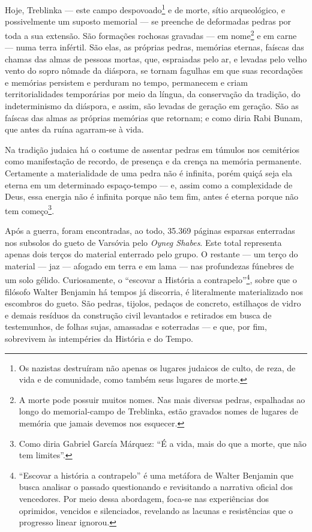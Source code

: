 Hoje, Treblinka --- este campo despovoado\footnote{Os nazistas
  destruíram não apenas os lugares judaicos de culto, de reza, de vida e
  de comunidade, como também seus lugares de morte.} e de morte, sítio
arqueológico, e possivelmente um suposto memorial --- se preenche de
deformadas pedras por toda a sua extensão. São formações rochosas
gravadas --- em nome\footnote{A morte pode possuir muitos nomes. Nas
  mais diversas pedras, espalhadas ao longo do memorial-campo de
  Treblinka, estão gravados nomes de lugares de memória que jamais
  devemos nos esquecer.} e em carne --- numa terra infértil. São elas,
as próprias pedras, memórias eternas, faíscas das chamas das almas de
pessoas mortas, que, espraiadas pelo ar, e levadas pelo velho vento do
sopro nômade da diáspora, se tornam fagulhas em que suas recordações e
memórias persistem e perduram no tempo, permanecem e criam
territorialidades temporárias por meio da língua, da conservação da
tradição, do indeterminismo da diáspora, e assim, são levadas de geração
em geração. São as faíscas das almas as próprias memórias que retornam;
e como diria Rabi Bunam, que antes da ruína agarram-se à vida.

Na tradição judaica há o costume de assentar pedras em túmulos nos
cemitérios como manifestação de recordo, de presença e da crença na
memória permanente. Certamente a materialidade de uma pedra não é
infinita, porém quiçá seja ela eterna em um determinado espaço-tempo ---
e, assim como a complexidade de Deus, essa energia não é infinita porque
não tem fim, antes é eterna porque não tem começo\footnote{Como diria
  Gabriel García Márquez: ``É a vida, mais do que a morte, que não
  tem limites''.}.

Após a guerra, foram encontradas, ao todo, 35.369 páginas esparsas
enterradas nos subsolos do gueto de Varsóvia pelo \emph{Oyneg Shabes}.
Este total representa apenas dois terços do material enterrado pelo
grupo. O restante --- um terço do material --- jaz --- afogado em terra
e em lama --- nas profundezas fúnebres de um solo gélido. Curiosamente,
o ``escovar a História a contrapelo''\footnote{``Escovar a
  história a contrapelo'' é uma metáfora de Walter Benjamin que busca
  analisar o passado questionando e revisitando a narrativa oficial dos
  vencedores. Por meio dessa abordagem, foca-se nas experiências dos
  oprimidos, vencidos e silenciados, revelando as lacunas e resistências
  que o progresso linear ignorou.}, sobre que o filósofo Walter Benjamin
há tempos já discorria, é literalmente materializado nos escombros do
gueto. São pedras, tijolos, pedaços de concreto, estilhaços de vidro e
demais resíduos da construção civil levantados e retirados em busca de
testemunhos, de folhas sujas, amassadas e soterradas --- e que, por fim,
sobrevivem às intempéries da História e do Tempo.

